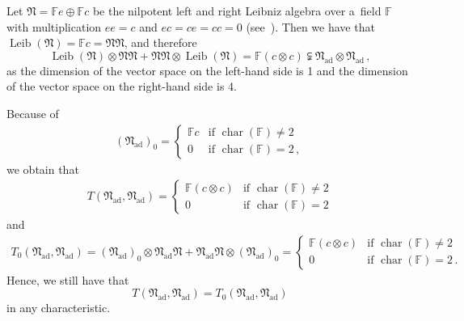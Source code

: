\documentclass{jonasart}
\DeclareMathOperator{\ad}{ad}
\DeclareMathOperator{\ch}{char}
\DeclareMathOperator{\leib}{Leib}
\newcommand{\fbb}{\mathbb{F}}
\newcommand{\nf}{\mathfrak{N}}
\begin{document}
	\begin{example}
		{Let $\nf=\fbb e\oplus\fbb c$ be the nilpotent left and right Leibniz algebra over a~field $\fbb$ with multiplication $ee
		=c$ and $ec=ce=cc=0$ (see~\cite[Example~2.4]{F1}). Then we have that $\leib(\nf)=\fbb c=\nf\nf$, and therefore}
		\[
			\leib(\nf)\otimes\nf\nf+\nf\nf\otimes\leib(\nf)=\fbb
			(c\otimes c)\subsetneqq\nf_{\ad}\otimes\nf_{\ad}\,,
		\]
		{as the dimension of the vector space on the left-hand side is 1 and the dimension of the vector space on the right-hand side is 4.}

		{Because of}
		\begin{eqnarray*}
			(\nf_{\ad})_0 =
			\left\{
			\begin{array}
				{cl}
				\fbb c & \mbox{if }\ch(\fbb)\ne 2\\
				0 & \mbox{if }\ch(\fbb)=2\,,
			\end{array}
			\right.
		\end{eqnarray*}
		{we obtain that}
		\begin{eqnarray*}
			T(\nf_{\ad},\nf_{\ad})=
			\left\{
			\begin{array}
				{cl}
				\fbb(c\otimes c) & \mbox{if }\ch(\fbb)\ne 2\\
				0 & \mbox{if }\ch(\fbb)=2
			\end{array}
			\right.
		\end{eqnarray*}
		and
		\begin{eqnarray*}
			T_0 (\nf_{\ad},\nf_{\ad})=(\nf_{\ad})_0\otimes\nf_{\ad}\nf+\nf_{\ad}\nf
			\otimes(\nf_{\ad})_0 =
			\left\{
			\begin{array}
				{cl}
				\fbb(c\otimes c) & \mbox{if }\ch(\fbb)\ne 2\\
				0 & \mbox{if }\ch(\fbb)=2\,.
			\end{array}
			\right.
		\end{eqnarray*}
		{Hence, we still have that}
		\[
			T(\nf_{\ad},\nf_{\ad})=T_0 (\nf_{\ad},\nf_{\ad})
		\]
		{in any characteristic.}
	\end{example}
\end{document}

